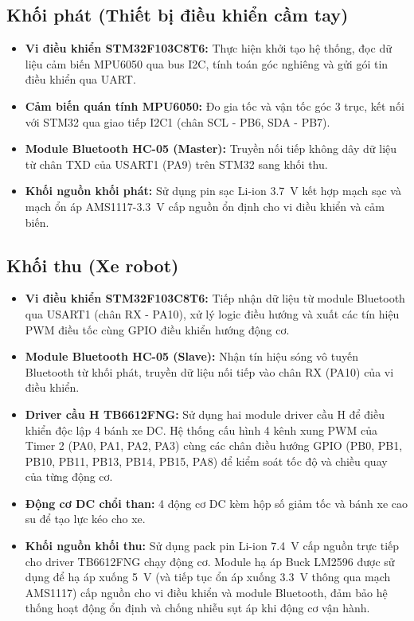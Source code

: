 \subsection{Khối phát (Thiết bị điều khiển cầm tay)}
\begin{itemize}
    \item \textbf{Vi điều khiển STM32F103C8T6:} Thực hiện khởi tạo hệ thống, đọc dữ liệu cảm biến MPU6050 qua bus I2C, tính toán góc nghiêng và gửi gói tin điều khiển qua UART.
    \item \textbf{Cảm biến quán tính MPU6050:} Đo gia tốc và vận tốc góc 3 trục, kết nối với STM32 qua giao tiếp I2C1 (chân SCL - PB6, SDA - PB7).
    \item \textbf{Module Bluetooth HC-05 (Master):} Truyền nối tiếp không dây dữ liệu từ chân TXD của USART1 (PA9) trên STM32 sang khối thu.
    \item \textbf{Khối nguồn khối phát:} Sử dụng pin sạc Li-ion \qty{3.7}{\volt} kết hợp mạch sạc và mạch ổn áp AMS1117-\qty{3.3}{\volt} cấp nguồn ổn định cho vi điều khiển và cảm biến.
\end{itemize}

\subsection{Khối thu (Xe robot)}
\begin{itemize}
    \item \textbf{Vi điều khiển STM32F103C8T6:} Tiếp nhận dữ liệu từ module Bluetooth qua USART1 (chân RX - PA10), xử lý logic điều hướng và xuất các tín hiệu PWM điều tốc cùng GPIO điều khiển hướng động cơ.
    \item \textbf{Module Bluetooth HC-05 (Slave):} Nhận tín hiệu sóng vô tuyến Bluetooth từ khối phát, truyền dữ liệu nối tiếp vào chân RX (PA10) của vi điều khiển.
    \item \textbf{Driver cầu H TB6612FNG:} Sử dụng hai module driver cầu H để điều khiển độc lập 4 bánh xe DC. Hệ thống cấu hình 4 kênh xung PWM của Timer 2 (PA0, PA1, PA2, PA3) cùng các chân điều hướng GPIO (PB0, PB1, PB10, PB11, PB13, PB14, PB15, PA8) để kiểm soát tốc độ và chiều quay của từng động cơ.
    \item \textbf{Động cơ DC chổi than:} 4 động cơ DC kèm hộp số giảm tốc và bánh xe cao su để tạo lực kéo cho xe.
    \item \textbf{Khối nguồn khối thu:} Sử dụng pack pin Li-ion \qty{7.4}{\volt} cấp nguồn trực tiếp cho driver TB6612\-FNG chạy động cơ. Module hạ áp Buck LM2596 được sử dụng để hạ áp xuống \qty{5}{\volt} (và tiếp tục ổn áp xuống \qty{3.3}{\volt} thông qua mạch AMS1117) cấp nguồn cho vi điều khiển và module Blue\-tooth, đảm bảo hệ thống hoạt động ổn định và chống nhiễu sụt áp khi động cơ vận hành.
\end{itemize}


